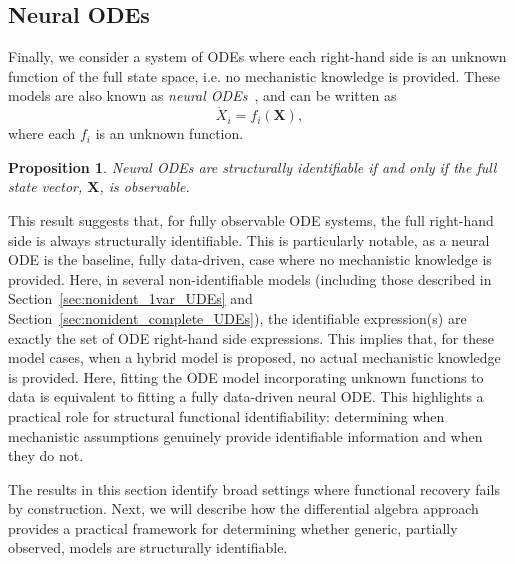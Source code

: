 \documentclass{article}
\theoremstyle{plain}
\newtheorem{proposition}{Proposition}[section]
\theoremstyle{definition}
\renewcommand{\vec}[1]{\boldsymbol{#1}}
\begin{document}
{%

\subsection{Neural ODEs} \label{sec:nonident_neural_odes}

Finally, we consider a system of ODEs where each right-hand side is an unknown function of the full state space, i.e. no mechanistic knowledge is provided. These models are also known as \emph{neural ODEs}~\cite{chen_neural_2019,kidger_neural_2020}, and can be written as 
\begin{equation} \label{eq:nonident_neural_odes}
    \dot{X}_i = f_i(\vec{X}),
\end{equation}
where each $f_i$ is an unknown function.

\begin{proposition} \label{prop:nonident_neural_odes}
Neural ODEs are structurally identifiable if and only if the full state vector, $\vec{X}$, is observable.
\end{proposition}

This result suggests that, for fully observable ODE systems, the full right-hand side is always structurally identifiable. This is particularly notable, as a neural ODE is the baseline, fully data-driven, case where no mechanistic knowledge is provided. Here, in several non-identifiable models (including those described in Section~\ref{sec:nonident_1var_UDEs} and Section~\ref{sec:nonident_complete_UDEs}), the identifiable expression(s) are exactly the set of ODE right-hand side expressions. This implies that, for these model cases, when a hybrid model is proposed, no actual mechanistic knowledge is provided. Here, fitting the ODE model incorporating unknown functions to data is equivalent to fitting a fully data-driven neural ODE. This highlights a practical role for structural functional identifiability: determining when mechanistic assumptions genuinely provide identifiable information and when they do not.

The results in this section identify broad settings where functional recovery fails by construction. Next, we will describe how the differential algebra approach provides a practical framework for determining whether generic, partially observed, models are structurally identifiable.


}
\end{document}
